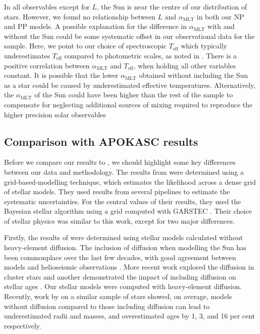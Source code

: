 \documentclass[fleqn,usenatbib]{mnras}
\newcommand{\teff}{\ensuremath{T_\mathrm{eff}}}
\newcommand{\mlt}{\ensuremath{{\alpha_\mathrm{MLT}}}}
\begin{document}
In all observables except for $L$, the Sun is near the centre of our distribution of stars. However, we found no relationship between $L$ and $\mlt$ in both our NP and PP models. A possible explanation for the difference in $\mlt$ with and without the Sun could be some systematic offset in our observational data for the sample. Here, we point to our choice of spectroscopic $\teff$ which typically underestimates $\teff$ compared to photometric scales, as noted in . There is a positive correlation between $\mlt$ and $\teff$, when holding all other variables constant. It is possible that the lower $\mlt$ obtained without including the Sun as a star could be caused by underestimated effective temperatures. Alternatively, the $\mlt$ of the Sun could have been higher than the rest of the sample to compensate for neglecting additional sources of mixing required to reproduce the higher precision solar observables

\subsection{Comparison with APOKASC results}\label{sec:comp}

Before we compare our results to , we should highlight some key differences between our data and methodology. The results from  were determined using a grid-based-modelling technique, which estimates the likelihood across a dense grid of stellar models. They used results from several pipelines to estimate the systematic uncertainties. For the central values of their results, they used the Bayesian stellar algorithm \citep[BASTA;][]{SilvaAguirre.Davies.ea2015} using a grid computed with \textsc{GARSTEC} \citep{Weiss.Schlattl2008}. Their choice of stellar physics was similar to this work, except for two major differences.

Firstly, the results of  were determined using stellar models calculated without heavy-element diffusion. The inclusion of diffusion when modelling the Sun has been commonplace over the last few decades, with good agreement between models and helioseismic observations \citep{Christensen-Dalsgaard.Proffitt.ea1993, Bahcall.Pinsonneault.ea1995}. More recent work explored the diffusion in cluster stars \citep{Korn.Grundahl.ea2007, Onehag.Gustafsson.ea2014} and another demonstrated the impact of including diffusion on stellar ages \citep{Dotter.Conroy.ea2017}. Our stellar models were computed with heavy-element diffusion. Recently, work by \citet{Nsamba.Campante.ea2018} on a similar sample of stars showed, on average, models without diffusion compared to those including diffusion can lead to underestimated radii and masses, and overestimated ages by 1, 3, and 16 per cent respectively.
\end{document}
